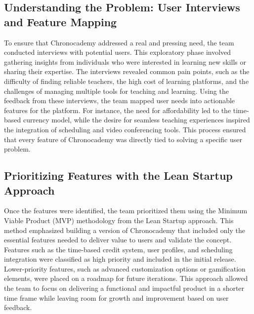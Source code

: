\subsection{Understanding the Problem: User Interviews and Feature Mapping}\label{subsec:understanding-the-problem:-user-interviews-and-feature-mapping}
To ensure that Chronocademy addressed a real and pressing need, the team conducted interviews with potential users.
This exploratory phase involved gathering insights from individuals who were interested in learning new skills or sharing their expertise.
The interviews revealed common pain points, such as the difficulty of finding reliable teachers, the high cost of learning platforms, and the challenges of managing multiple tools for teaching and learning.
Using the feedback from these interviews, the team mapped user needs into actionable features for the platform.
For instance, the need for affordability led to the time-based currency model, while the desire for seamless teaching experiences inspired the integration of scheduling and video conferencing tools.
This process ensured that every feature of Chronocademy was directly tied to solving a specific user problem.

\subsection{Prioritizing Features with the Lean Startup Approach}\label{subsec:prioritizing-features-with-the-lean-startup-approach}
Once the features were identified, the team prioritized them using the Minimum Viable Product (MVP) methodology from the Lean Startup approach.
This method emphasized building a version of Chronocademy that included only the essential features needed to deliver value to users and validate the concept.
Features such as the time-based credit system, user profiles, and scheduling integration were classified as high priority and included in the initial release.
Lower-priority features, such as advanced customization options or gamification elements, were placed on a roadmap for future iterations.
This approach allowed the team to focus on delivering a functional and impactful product in a shorter time frame while leaving room for growth and improvement based on user feedback.



